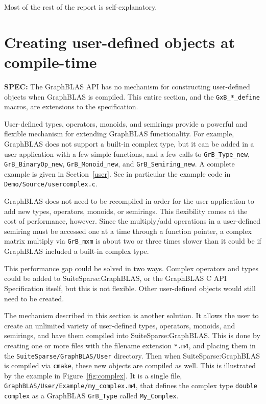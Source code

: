 \documentclass[12pt]{article}
\begin{document}
Most of the rest of the report is self-explanatory.

\newpage
\section{Creating user-defined objects at compile-time} %
\label{precompile}

\begin{spec}
{\bf SPEC:} The GraphBLAS API has no mechanism for constructing user-defined
objects when GraphBLAS is compiled.  This entire section, and the
\verb'GxB_*_define' macros, are extensions to the specification.
\end{spec}

User-defined types, operators, monoids, and semirings provide a powerful and
flexible mechanism for extending GraphBLAS functionality.  For example,
GraphBLAS does not support a built-in complex type, but it can be added in a
user application with a few simple functions, and a few calls to
\verb'GrB_Type_new', \verb'GrB_BinaryOp_new', \verb'GrB_Monoid_new', and
\verb'GrB_Semiring_new'.  A complete example is given in Section~\ref{user}.
See in particular the example code in \verb'Demo/Source/usercomplex.c'.

GraphBLAS does not need to be recompiled in order for the user application to
add new types, operators, monoids, or semirings.  This flexibility comes at the
cost of performance, however.  Since the multiply/add operations in a
user-defined semiring must be accessed one at a time through a function
pointer, a complex matrix multiply via \verb'GrB_mxm' is about two or three
times slower than it could be if GraphBLAS included a built-in complex type.

This performance gap could be solved in two ways.  Complex operators and types
could be added to SuiteSparse:GraphBLAS, or the GraphBLAS C API
Specification itself, but this is not flexible.  Other user-defined objects
would still need to be created.

The mechanism described in this section is another solution.  It allows the
user to create an unlimited variety of user-defined types, operators, monoids,
and semirings, and have them compiled into SuiteSparse:GraphBLAS.  This is done
by creating one or more files with the filename extension \verb'*.m4', and
placing them in the \verb'SuiteSparse/GraphBLAS/User' directory.  Then when
SuiteSparse:GraphBLAS is compiled via \verb'cmake', these new objects are
compiled as well.  This is illustrated by the example in
Figure~\ref{fig:complex}.  It is a single file,
\verb'GraphBLAS/User/Example/my_complex.m4', that defines the complex type
\verb'double complex' as a GraphBLAS \verb'GrB_Type' called \verb'My_Complex'.
\end{document}
